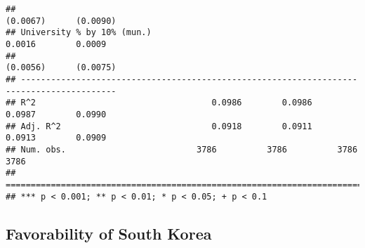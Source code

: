 \documentclass[
]{article}
\begin{document}
\begin{verbatim}
##                                                                  (0.0067)      (0.0090)  
## University % by 10% (mun.)                                        0.0016        0.0009   
##                                                                  (0.0056)      (0.0075)  
## -----------------------------------------------------------------------------------------
## R^2                                   0.0986        0.0986        0.0987        0.0990   
## Adj. R^2                              0.0918        0.0911        0.0913        0.0909   
## Num. obs.                          3786          3786          3786          3786        
## =========================================================================================
## *** p < 0.001; ** p < 0.01; * p < 0.05; + p < 0.1
\end{verbatim}

\hypertarget{favorability-of-south-korea-4}{%
\subsection{Favorability of South
Korea}\label{favorability-of-south-korea-4}}
\end{document}
